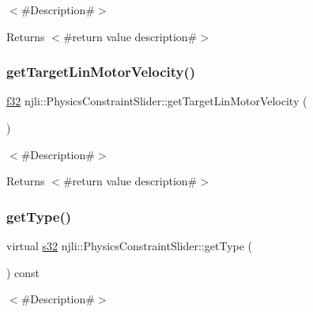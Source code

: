 $<$\#\+Description\#$>$

\begin{DoxyReturn}{Returns}
$<$\#return value description\#$>$ 
\end{DoxyReturn}
\mbox{\label{classnjli_1_1_physics_constraint_slider_ab66ac3f4e1e63a699a3ebadf275b6437}} 
\subsubsection{\texorpdfstring{get\+Target\+Lin\+Motor\+Velocity()}{getTargetLinMotorVelocity()}}
{\footnotesize\ttfamily \mbox{\hyperlink{_util_8h_a5f6906312a689f27d70e9d086649d3fd}{f32}} njli\+::\+Physics\+Constraint\+Slider\+::get\+Target\+Lin\+Motor\+Velocity (\begin{DoxyParamCaption}{ }\end{DoxyParamCaption})}

$<$\#\+Description\#$>$

\begin{DoxyReturn}{Returns}
$<$\#return value description\#$>$ 
\end{DoxyReturn}
\mbox{\label{classnjli_1_1_physics_constraint_slider_a7cc1bbd160314dabb3c6764a8ea1e307}} 
\subsubsection{\texorpdfstring{get\+Type()}{getType()}}
{\footnotesize\ttfamily virtual \mbox{\hyperlink{_util_8h_aa62c75d314a0d1f37f79c4b73b2292e2}{s32}} njli\+::\+Physics\+Constraint\+Slider\+::get\+Type (\begin{DoxyParamCaption}{ }\end{DoxyParamCaption}) const\hspace{0.3cm}{\ttfamily [virtual]}}

$<$\#\+Description\#$>$


